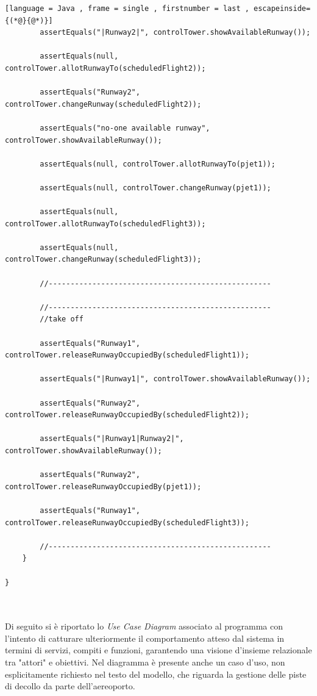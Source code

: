 \documentclass{article}
\begin{document}
\begin{sloppy}
\begin{lstlisting}[language = Java , frame = single , firstnumber = last , escapeinside={(*@}{@*)}]
		assertEquals("|Runway2|", controlTower.showAvailableRunway());
		
		assertEquals(null, controlTower.allotRunwayTo(scheduledFlight2));
		
		assertEquals("Runway2", controlTower.changeRunway(scheduledFlight2));
		
		assertEquals("no-one available runway", controlTower.showAvailableRunway());
		
		assertEquals(null, controlTower.allotRunwayTo(pjet1));
		
		assertEquals(null, controlTower.changeRunway(pjet1));
		
		assertEquals(null, controlTower.allotRunwayTo(scheduledFlight3));
		
		assertEquals(null, controlTower.changeRunway(scheduledFlight3));
		
		//---------------------------------------------------
		
		//---------------------------------------------------
		//take off
		
		assertEquals("Runway1", controlTower.releaseRunwayOccupiedBy(scheduledFlight1));
		
		assertEquals("|Runway1|", controlTower.showAvailableRunway());
		
		assertEquals("Runway2", controlTower.releaseRunwayOccupiedBy(scheduledFlight2));
		
		assertEquals("|Runway1|Runway2|", controlTower.showAvailableRunway());
		
		assertEquals("Runway2", controlTower.releaseRunwayOccupiedBy(pjet1));
		
		assertEquals("Runway1", controlTower.releaseRunwayOccupiedBy(scheduledFlight3));
		
		//---------------------------------------------------
	}

}



\end{lstlisting}

\bigbreak

Di seguito si è riportato lo \textit{Use Case Diagram} associato al programma con l'intento di catturare ulteriormente il comportamento atteso dal sistema in termini di servizi, compiti e funzioni, garantendo una visione d'insieme relazionale tra "attori" e obiettivi.
Nel diagramma è presente anche un caso d'uso, non esplicitamente richiesto nel testo del modello, che riguarda la gestione delle piste di decollo da parte dell'aereoporto.


\end{sloppy}
\end{document}
